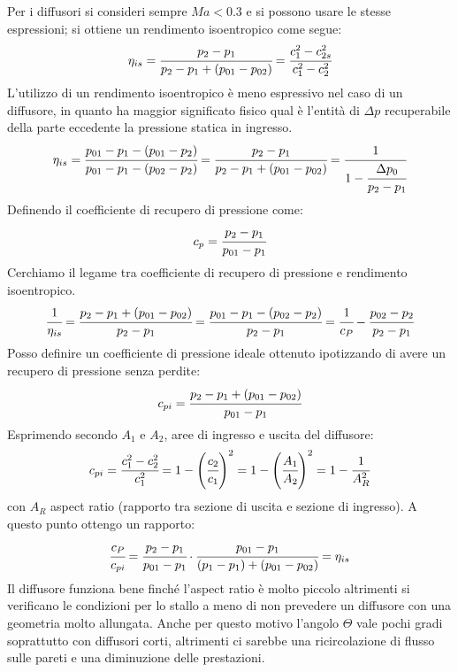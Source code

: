 Per i diffusori si consideri sempre $Ma<0.3$ e si possono usare le stesse espressioni; si ottiene un rendimento isoentropico come segue:
\begin{align*}
\eta_{is} = \cfrac{p_2 - p_1}{p_2-p_1 + (p_{01}-p_{02})} = \cfrac{c_1^2 - c_{2s}^2}{c_1^2 - c_2^2}
\end{align*}
L'utilizzo di un rendimento isoentropico è meno espressivo nel caso di un diffusore, in quanto ha maggior significato fisico qual è l'entità di $ \Delta p$ recuperabile della parte eccedente la pressione statica in ingresso.
\begin{align*}
\eta_{is} = \cfrac{p_{01} - p_1 - (p_{01} - p_2)}{p_{01} - p_1-(p_{02} - p_2)} = \cfrac{p_2 - p_1}{p_2 - p_1 + (p_{01} - p_{02})} = \cfrac{1}{1- \cfrac{\Delta p_0}{p_2 - p_1}}
\end{align*}
Definendo il coefficiente di recupero di pressione come:
\begin{align*}
c_p = \cfrac{p_2 - p_1}{p_{01} - p_1}
\end{align*}
Cerchiamo il legame tra coefficiente di recupero di pressione e rendimento isoentropico.
\begin{align*}
\cfrac{1}{\eta_{is}} = \cfrac{p_2 - p_1 + (p_{01} - p_{02})}{p_2 - p_1} = \cfrac{p_{01} - p_1 - (p_{02} - p_2)}{p_2-p_1} = \cfrac{1}{c_P} - \cfrac{p_{02} - p_2}{p_2 - p_1}
\end{align*}
Posso definire un coefficiente di pressione ideale ottenuto ipotizzando di avere un recupero di pressione senza perdite:
\begin{align*}
c_{pi} = \cfrac{p_2 - p_1 + (p_{01} - p_{02})}{p_{01} - p_1}
\end{align*}
Esprimendo secondo $A_1$ e $A_2$, aree di ingresso e uscita del diffusore:
\begin{align*}
c_{pi} = \cfrac{c_1^2 - c_2^2}{c_1^2} = 1 - \left( \cfrac{c_2}{c_1}\right)^2 = 1- \left(\cfrac{A_1}{A_2} \right)^2 =1-\cfrac{1}{A_R^2}
\end{align*}
con $A_R$ aspect ratio (rapporto tra sezione di uscita e sezione di ingresso). A questo punto ottengo un rapporto:
\begin{align*}
\cfrac{c_P}{c_{pi}} = \cfrac{p_2-p_1}{p_{01}-p_1} \cdot \cfrac{p_{01}-p_1}{(p_1-p_1)+(p_{01}-p_{02})}= \eta_{is}
\end{align*}
Il diffusore funziona bene finché l'aspect ratio è molto piccolo altrimenti si verificano le condizioni per lo stallo a meno di non prevedere un diffusore con una geometria molto allungata. Anche per questo motivo l'angolo $\Theta$ vale pochi gradi soprattutto con diffusori corti, altrimenti ci sarebbe una ricircolazione di flusso sulle pareti e una diminuzione delle prestazioni. 
